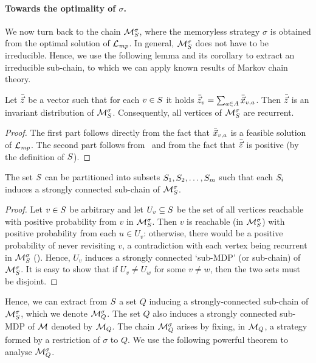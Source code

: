 \noindent
\paragraph{Towards the optimality of $ \sigma $.} We now turn back to the chain $\mathcal{M}_{S}^{\sigma}$, where the memoryless strategy $ \sigma $ is obtained from the optimal solution of $ \mathcal{L}_{\mathit{mp}} $. In general, $ \mathcal{M}_{S}^{\sigma} $ does not have to be irreducible. Hence, we use the following lemma and its corollary to extract an irreducible sub-chain, to which we can apply known results of Markov chain theory.

\begin{lemma}
\label{5-lem:mc-rec}
Let $\bar{\vec{z}}$ be a vector such that for each $v\in S$ it holds $\bar{\vec{z}}_v=\sum_{a\in A} \bar{\vec{x}}_{v,a}$. Then $\bar{\vec{z}}$ is an invariant distribution of $\mathcal{M}_{S}^{\sigma}$. Consequently, all vertices of $\mathcal{M}_{S}^{\sigma}$ are recurrent.
\end{lemma}
\begin{proof}
The first part follows directly from the fact that $\bar{\vec{x}}_{v,a}$ is a feasible solution of $\mathcal{L}_{\mathit{mp}}$. The second part follows from~ and from the fact that $\bar{\vec{z}}$ is positive (by the definition of $S$).
\end{proof}

\begin{corollary}
\label{5-cor:mp-scc-extraction}
The set $S$ can be partitioned into subsets $S_1,S_2,\dots,S_m$ such that each $S_i$ induces a strongly connected sub-chain of $\mathcal{M}_{S}^{\sigma}$.
\end{corollary}
\begin{proof}
Let $v\in S$ be arbitrary and let $U_v\subseteq S$ be the set of all vertices reachable with positive probability from $v$ in $\mathcal{M}_{S}^{\sigma}$. Then $v$ is reachable (in $\mathcal{M}_{S}^{\sigma}$) with positive probability from each $u\in U_v$: otherwise, there would be a positive probability of never revisiting $v$, a contradiction with each vertex being recurrent in $\mathcal{M}_{S}^{\sigma}$ (). Hence, $U_v$ induces a strongly connected `sub-MDP' (or sub-chain) of $\mathcal{M}_{S}^{\sigma}$. It is easy to show that if $U_v \neq U_w$ for some $v\neq w $, then the two sets must be disjoint.
\end{proof}

Hence, we can extract from $S$ a set $Q$ inducing a strongly-connected sub-chain of $\mathcal{M}_{S}^{\sigma}$, which we denote $\mathcal{M}^{\sigma}_{Q}$. The set $Q$ also induces a strongly connected sub-MDP of $\mathcal{M}$ denoted by $\mathcal{M}_Q$. The chain $\mathcal{M}^{\sigma}_{Q}$ arises by fixing, in $\mathcal{M}_Q$, a strategy formed by a restriction of $\sigma$ to $Q$. We use the following powerful theorem to analyse $\mathcal{M}^{\sigma}_{Q}$.


